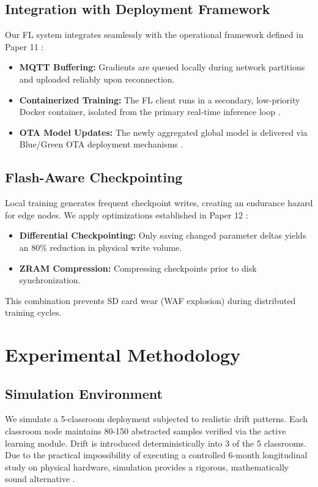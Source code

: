 \documentclass[conference]{IEEEtran}
\begin{document}
\subsection{Integration with Deployment Framework}

Our FL system integrates seamlessly with the operational framework defined in Paper 11 \cite{b1}:
\begin{itemize}
    \item \textbf{MQTT Buffering:} Gradients are queued locally during network partitions and uploaded reliably upon reconnection.
    \item \textbf{Containerized Training:} The FL client runs in a secondary, low-priority Docker container, isolated from the primary real-time inference loop \cite{b22}.
    \item \textbf{OTA Model Updates:} The newly aggregated global model is delivered via Blue/Green OTA deployment mechanisms \cite{b23}.
\end{itemize}

\subsection{Flash-Aware Checkpointing}
Local training generates frequent checkpoint writes, creating an endurance hazard for edge nodes. We apply optimizations established in Paper 12 \cite{b9}:
\begin{itemize}
    \item \textbf{Differential Checkpointing:} Only saving changed parameter deltas yields an 80\% reduction in physical write volume.
    \item \textbf{ZRAM Compression:} Compressing checkpoints prior to disk synchronization.
\end{itemize}
This combination prevents SD card wear (WAF explosion) during distributed training cycles.

\section{Experimental Methodology}

\subsection{Simulation Environment}
We simulate a 5-classroom deployment subjected to realistic drift patterns. Each classroom node maintains 80-150 abstracted samples verified via the active learning module. Drift is introduced deterministically into 3 of the 5 classrooms. Due to the practical impossibility of executing a controlled 6-month longitudinal study on physical hardware, simulation provides a rigorous, mathematically sound alternative \cite{b26}.
\end{document}
